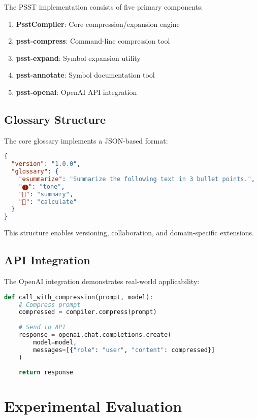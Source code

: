 \documentclass[11pt,twocolumn]{article}
\begin{document}
The PSST implementation consists of five primary components:

\begin{enumerate}
\item \textbf{PsstCompiler}: Core compression/expansion engine
\item \textbf{psst-compress}: Command-line compression tool
\item \textbf{psst-expand}: Symbol expansion utility
\item \textbf{psst-annotate}: Symbol documentation tool
\item \textbf{psst-openai}: OpenAI API integration
\end{enumerate}

\subsection{Glossary Structure}

The core glossary implements a JSON-based format:

\begin{lstlisting}[language=JSON, caption=Glossary Format]
{
  "version": "1.0.0",
  "glossary": {
    "⊕summarize": "Summarize the following text in 3 bullet points.",
    "🅣": "tone",
    "📄": "summary",
    "🧮": "calculate"
  }
}
\end{lstlisting}

This structure enables versioning, collaboration, and domain-specific extensions.

\subsection{API Integration}

The OpenAI integration demonstrates real-world applicability:

\begin{lstlisting}[language=Python, caption=API Integration Pattern]
def call_with_compression(prompt, model):
    # Compress prompt
    compressed = compiler.compress(prompt)
    
    # Send to API
    response = openai.chat.completions.create(
        model=model,
        messages=[{"role": "user", "content": compressed}]
    )
    
    return response
\end{lstlisting}

\section{Experimental Evaluation}
\end{document}
